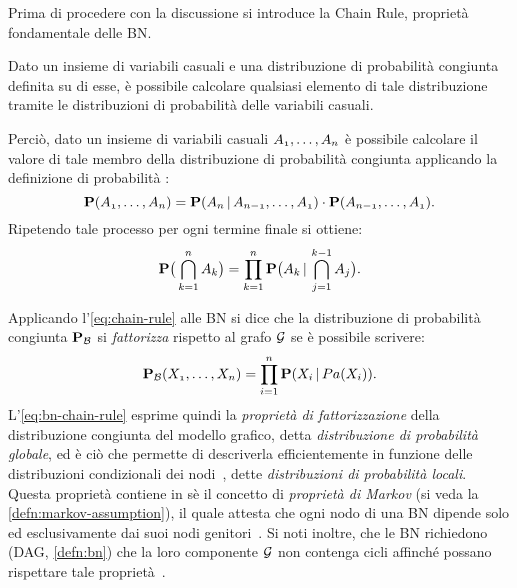Prima di procedere con la discussione si introduce la Chain Rule, proprietà fondamentale delle \acs{BN}.

\begin{teorema}
Dato un insieme di variabili casuali e una distribuzione di probabilità congiunta definita su di esse, è possibile calcolare qualsiasi elemento di tale distribuzione tramite le distribuzioni di probabilità \cond*{} delle variabili casuali.
\end{teorema}

Perciò, dato un insieme di variabili casuali $\mathnormal{A_1},\dotsc,\mathnormal{A_n}$ è possibile calcolare il valore di tale membro della distribuzione di probabilità congiunta applicando la definizione di probabilità \cond*{}:
\[
\mathbf{P}(\mathnormal{A_1},\dotsc,\mathnormal{A_n})=\mathbf{P}(\mathnormal{A_n}\,\arrowvert\,\mathnormal{A_{n-1}},\dotsc,\mathnormal{A_1})\cdot\mathbf{P}(\mathnormal{A_{n-1}},\dotsc,\mathnormal{A_1})\text{.}
\]
Ripetendo tale processo per ogni termine finale si ottiene:
\begin{equation}
\label{eq:chain-rule}
\mathbf{P}\big(\bigcap_{k=1}^{n}\mathnormal{A_k}\big)=\prod_{k=1}^{n}\mathbf{P}\big(\mathnormal{A_k}\,\arrowvert\,\bigcap_{j=1}^{k-1}\mathnormal{A_j}\big)\text{.}
\end{equation}

Applicando l'\autoref{eq:chain-rule} alle \acl{BN} si dice che la distribuzione di probabilità congiunta $\mathbf{P}_{\mathcal{B}}$ si \emph{fattorizza} rispetto al grafo $\mathcal{G}$ se è possibile scrivere:
\begin{equation}\label{eq:bn-chain-rule}
\mathbf{P}_{\mathcal{B}}(\mathnormal{X_1}, \dotsc, \mathnormal{X_n})=\prod_{i=1}^{n}\mathbf{P}(\mathnormal{X_i}\,\arrowvert\,Pa(\mathnormal{X_i}))\text{.}
\end{equation}
L'\autoref{eq:bn-chain-rule} esprime quindi la \emph{proprietà di fattorizzazione} della distribuzione congiunta del modello grafico, detta \emph{distribuzione di probabilità globale}, ed è ciò che permette di descriverla efficientemente in funzione delle distribuzioni condizionali dei nodi~\citep[][sezione 14.2]{Russel2003}, dette \emph{distribuzioni di probabilità locali}. Questa proprietà contiene in sè il concetto di \emph{proprietà di Markov} (si veda la \autoref{defn:markov-assumption}), il quale attesta che ogni nodo di una \acl{BN} dipende solo ed esclusivamente dai suoi nodi genitori~\citep[][sottosezione 2.2.4]{Korb2011}. Si noti inoltre, che le \acl{BN} richiedono (\acs{DAG}, \autoref{defn:bn}) che la loro componente $\mathcal{G}$ non contenga cicli  affinché possano rispettare tale proprietà~\citep[][sezione 14.1]{Russel2003}.


